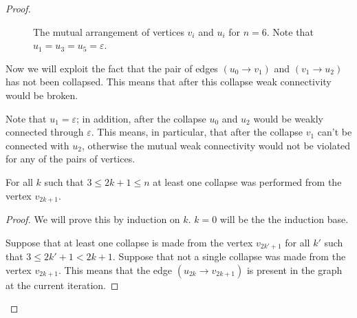 \begin{proof}
\begin{figure}[ht]
\begin{center}
\end{center}

\caption{The mutual arrangement of vertices $ v_i $ and $ u_i $ for $ n = 6 $. Note that $u_1=u_3=u_5=\varepsilon$.}\label{fig:lvl2pathuv}
\end{figure}

Now we will exploit the fact that the pair of edges $ (u_0 \to v_1) $ and $ (v_1 \to u_2) $ has not been collapsed. This means that after this collapse weak connectivity would be broken.

Note that $ u_1 = \varepsilon $; in addition, after the collapse $ u_0 $ and $ u_2 $ would be weakly connected through $ \varepsilon $. This means, in particular, that after the collapse $ v_1 $ can't be connected with $ u_2 $, otherwise the mutual weak connectivity would not be violated for any of the pairs of vertices.

\begin{lemma}
\label{lem:pathcollapse}
For all $ k $ such that $ 3 \le 2k + 1 \le n $ at least one collapse was performed from the vertex $ v_{2k + 1} $.\end{lemma}
\begin{proof}
We will prove this by induction on $ k $. $ k = 0 $ will be the the induction base.

Suppose that at least one collapse is made from the vertex $ v_{2k '+ 1} $ for all $ k' $ such that $ 3 \le 2k '+ 1 <2k + 1 $. Suppose that not a single collapse was made from the vertex $ v_{2k + 1} $. This means that the edge $ (u_{2k} \to v_{2k + 1}) $ is present in the graph at the current iteration.


\end{proof}
\end{proof}
